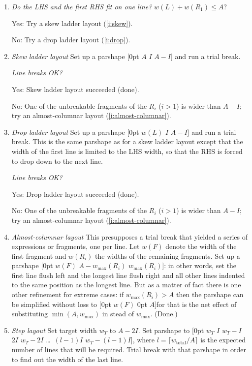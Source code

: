 \documentclass[twocolumn]{article}
\providecommand{\mdash}{\textemdash}
\newcommand{\ititle}[1]{\textit{#1}}
\begin{document}
\begin{small}
\begin{enumerate}
\item\ititle{Do the LHS and the first RHS fit on one
    line?}\label{i:skew-drop} $w(L)+w(R_1) \leq A$?

Yes: Try a skew ladder layout (\ref{i:skew}).

No: Try a drop ladder layout (\ref{i:drop}).

\item\ititle{Skew ladder layout}\label{i:skew}
Set up a parshape [0pt $A$ $I$ $A-I$] and run a trial break.

\ititle{Line breaks OK?}

Yes: Skew ladder layout succeeded (done).

No: One of the unbreakable fragments of the $R_i$ ($i>1$) is wider than
$A-I$; try an almost-columnar layout (\ref{i:almost-columnar}).

\item\ititle{Drop ladder layout}\label{i:drop}
Set up a parshape [0pt $w(L)$ $I$ $A-I$] and run a trial break.
This is the same parshape as for a skew ladder layout except that the
width of the first line is limited to the LHS width, so that the RHS is
forced to drop down to the next line.

\ititle{Line breaks OK?}

Yes: Drop ladder layout succeeded (done).

No: One of the unbreakable fragments of the $R_i$ ($i>1$) is wider than
$A-I$; try an almost-columnar layout (\ref{i:almost-columnar}).

\item\ititle{Almost-columnar layout}\label{i:almost-columnar}
This presupposes a trial break that yielded a series of expressions or
fragments, one per line. Let $w(F)$ denote the width of the first
fragment and $w(R_i)$ the widths of the remaining fragments.
Set up a parshape [0pt $w(F)$ $A-w_{\max}(R_i)$ $w_{\max}(R_i)$]: in other
words, set the first line flush left and the longest line flush right
and all other lines indented to the same position as the longest line.
But as a matter of fact there is one other refinement for extreme cases:
if $w_{\max}(R_i)>A$ then the parshape can be simplified without loss to
[0pt $w(F)$ 0pt $A$]\mdash for that is the net effect of substituting
$\min(A,w_{\max})$ in stead of $w_{\max}$.
(Done.)

\item\ititle{Step layout}\label{i:step} Set target width $w_T$ to $A -
  2I$.  Set parshape to [0pt $w_T$ $I$ $w_T -I$ $2I$ $w_T -2I$ \ldots\ 
  $(l-1)I$ $w_T - (l-1)I$], where $l=\lceil w_{\mathrm{total}}/A\rceil$
  is the expected number of lines that will be required.  Trial break
  with that parshape in order to find out the width of the last line.


\end{enumerate}
\end{small}
\end{document}
